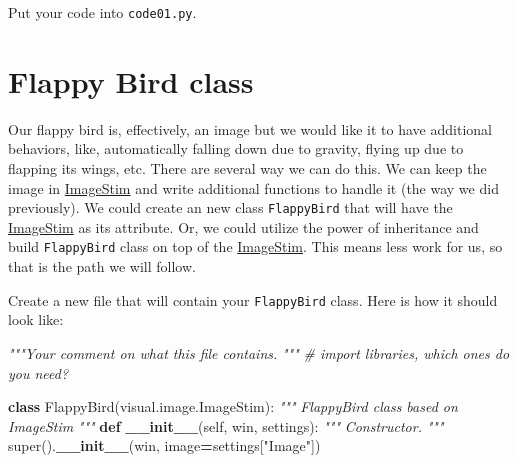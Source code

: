 \documentclass[
]{book}
\newenvironment{Shaded}{\begin{snugshade}}{\end{snugshade}}
\newcommand{\BuiltInTok}[1]{#1}
\newcommand{\CommentTok}[1]{\textcolor[rgb]{0.56,0.35,0.01}{\textit{#1}}}
\newcommand{\FunctionTok}[1]{\textcolor[rgb]{0.13,0.29,0.53}{\textbf{#1}}}
\newcommand{\KeywordTok}[1]{\textcolor[rgb]{0.13,0.29,0.53}{\textbf{#1}}}
\newcommand{\NormalTok}[1]{#1}
\newcommand{\OperatorTok}[1]{\textcolor[rgb]{0.81,0.36,0.00}{\textbf{#1}}}
\newcommand{\StringTok}[1]{\textcolor[rgb]{0.31,0.60,0.02}{#1}}
\newcommand{\VariableTok}[1]{\textcolor[rgb]{0.00,0.00,0.00}{#1}}
\begin{document}
Put your code into \texttt{code01.py}.

\hypertarget{flappy-bird-class}{%
\section{Flappy Bird class}\label{flappy-bird-class}}

Our flappy bird is, effectively, an image but we would like it to have additional behaviors, like, automatically falling down due to gravity, flying up due to flapping its wings, etc. There are several way we can do this. We can keep the image in \href{https://psychopy.org/api/visual/imagestim.html\#psychopy.visual.ImageStim}{ImageStim} and write additional functions to handle it (the way we did previously). We could create an new class \texttt{FlappyBird} that will have the \href{https://psychopy.org/api/visual/imagestim.html\#psychopy.visual.ImageStim}{ImageStim} as its attribute. Or, we could utilize the power of inheritance and build \texttt{FlappyBird} class on top of the \href{https://psychopy.org/api/visual/imagestim.html\#psychopy.visual.ImageStim}{ImageStim}. This means less work for us, so that is the path we will follow.

Create a new file that will contain your \texttt{FlappyBird} class. Here is how it should look like:

\begin{Shaded}
\begin{Highlighting}[]
\CommentTok{"""Your comment on what this file contains.}
\CommentTok{"""}
\CommentTok{\# import libraries, which ones do you need?}

\KeywordTok{class}\NormalTok{ FlappyBird(visual.image.ImageStim):}
  \CommentTok{"""}
\CommentTok{  FlappyBird class based on ImageStim}
\CommentTok{  """}
  \KeywordTok{def} \FunctionTok{\_\_init\_\_}\NormalTok{(}\VariableTok{self}\NormalTok{, win, settings):}
    \CommentTok{"""}
\CommentTok{    Constructor.}
\CommentTok{    """}
    \BuiltInTok{super}\NormalTok{().}\FunctionTok{\_\_init\_\_}\NormalTok{(win, image}\OperatorTok{=}\NormalTok{settings[}\StringTok{"Image"}\NormalTok{])}
\end{Highlighting}
\end{Shaded}
\end{document}

